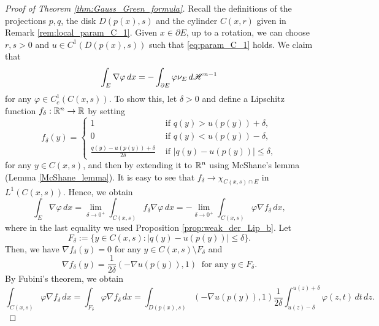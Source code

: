 \begin{proof}[Proof of Theorem \ref{thm:Gauss_Green_formula}]
Recall the definitions of the projections $p, q$, the disk $D(p(x), s)$ and the cylinder $C(x, r)$ given in Remark \ref{rem:local_param_C_1}.
Given $x \in \partial E$, up to a rotation, we can choose $r, s > 0$ and $u \in C^{1}(D(p(x), s))$ such that \eqref{eq:param_C_1} holds. We claim that
\begin{equation} \label{eq:claim_GG}
\int_{E} \nabla \varphi \, dx = - \int_{\partial E} \varphi \nu_{E} \, d \mathscr{H}^{n - 1}
\end{equation}
for any $\varphi \in C^{1}_{c}(C(x, s))$. To show this, let $\delta > 0$ and define a Lipschitz function $f_{\delta} : \mathbb{R}^{n} \to \mathbb{R}$ by setting
\begin{equation*}
f_{\delta}(y) = \begin{cases} 1 & \text{ if } q(y) > u(p(y)) + \delta, \\
0 & \text{ if } q(y) < u(p(y)) - \delta, \\
\frac{q(y) - u(p(y)) + \delta}{2 \delta} & \text{ if } |q(y) - u(p(y))| \le \delta, \end{cases}
\end{equation*}
for any $y \in C(x, s)$, and then by extending it to $\mathbb{R}^{n}$ using McShane's lemma (Lemma \ref{McShane_lemma}). It is easy to see that $f_{\delta} \to \chi_{C(x, s) \cap E}$ in $L^{1}(C(x, s))$. Hence, we obtain
\begin{equation*}
\int_{E} \nabla \varphi \, dx = \lim_{\delta \to 0^{+}} \int_{C(x, s)} f_{\delta} \nabla \varphi \, d x = - \lim_{\delta \to 0^{+}} \int_{C(x, s)} \varphi \nabla f_{\delta} \, dx,
\end{equation*}
where in the last equality we used Proposition \ref{prop:weak_der_Lip_b}. Let
\begin{equation*}
F_{\delta} := \{ y \in C(x, s) : |q(y) - u(p(y))| \le \delta \}.
\end{equation*}
Then, we have $\nabla f_{\delta}(y) = 0$ for any $y \in C(x, s) \setminus F_{\delta}$ and 
\begin{equation*}
\nabla f_{\delta}(y) = \frac{1}{2 \delta} (- \nabla u(p(y)), 1) \ \text{ for any } y \in F_{\delta}.
\end{equation*}
By Fubini's theorem, we obtain
\begin{equation*}
\int_{C(x, s)} \varphi \nabla f_{\delta} \, dx = \int_{F_{\delta}} \varphi \nabla f_{\delta} \, dx = \int_{D(p(x), s)} (- \nabla u(p(y)), 1) \frac{1}{2 \delta} \int_{u(z) - \delta}^{u(z) + \delta} \varphi(z, t) \, dt \, dz.

\end{equation*}
\end{proof}
